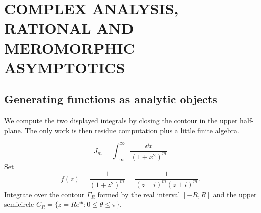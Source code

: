 \chapter{COMPLEX ANALYSIS, RATIONAL AND MEROMORPHIC ASYMPTOTICS}
\label{chap:complex analysis, rational and meromorphic asymptotics}

\section{Generating functions as analytic objects}

We compute the two displayed integrals by closing the contour in the upper half-plane. The
only work is then residue computation plus a little finite algebra.

\begin{equation*}
    J_{m} = \int_{-\infty}^{\infty} \frac{\dd x}{(1 + x^{2})^{m}}
\end{equation*}
Set
\begin{equation*}
    f(z) = \frac{1}{(1 + z^{2})^{m}} = \frac{1}{(z - i)^{m}(z + i)^{m}}.
\end{equation*}
Integrate over the contour $\Gamma_{R}$ formed by the real interval $[-R, R]$ and the upper semicircle
$C_{R} = \{ z = Re^{i\theta}: 0 \leq \theta \leq \pi \}$.

